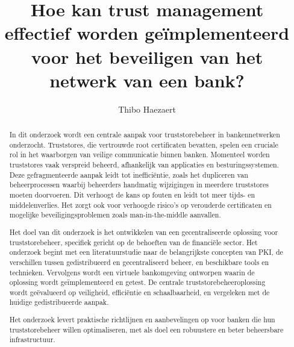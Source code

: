 \documentclass{hogent-article}
\title{Hoe kan trust management effectief worden geïmplementeerd voor het beveiligen van het netwerk van een bank?}
\author{Thibo Haezaert}
\begin{document}
\begin{abstract}
  In dit onderzoek wordt een centrale aanpak voor truststorebeheer in bankennetwerken onderzocht. 
  Truststores, die vertrouwde root certificaten bevatten, spelen een cruciale rol in het waarborgen van veilige communicatie binnen banken. 
  Momenteel worden truststores vaak verspreid beheerd, afhankelijk van applicaties en besturingssystemen. 
  Deze gefragmenteerde aanpak leidt tot inefficiëntie, zoals het dupliceren van beheerprocessen waarbij beheerders handmatig wijzigingen in meerdere truststores moeten doorvoeren. Dit verhoogt de kans op fouten en leidt tot meer tijds- en middelenverlies. Het zorgt ook voor verhoogde risico’s op verouderde certificaten en mogelijke beveiligingsproblemen zoals man-in-the-middle aanvallen.

  Het doel van dit onderzoek is het ontwikkelen van een gecentraliseerde oplossing voor truststorebeheer, specifiek gericht op de behoeften van de financiële sector. 
  Het onderzoek begint met een literatuurstudie naar de belangrijkste concepten van PKI, de verschillen tussen gedistribueerd en gecentraliseerd beheer, en beschikbare tools en technieken. 
  Vervolgens wordt een virtuele bankomgeving ontworpen waarin de oplossing wordt geïmplementeerd en getest. 
  De centrale truststorebeheeroplossing wordt geëvalueerd op veiligheid, efficiëntie en schaalbaarheid, en vergeleken met de huidige gedistribueerde aanpak.

  Het onderzoek levert praktische richtlijnen en aanbevelingen op voor banken die hun truststorebeheer willen optimaliseren, met als doel een robuustere en beter beheersbare infrastructuur.  
\end{abstract}

\tableofcontents



\printbibliography[heading=bibintoc]
\end{document}
